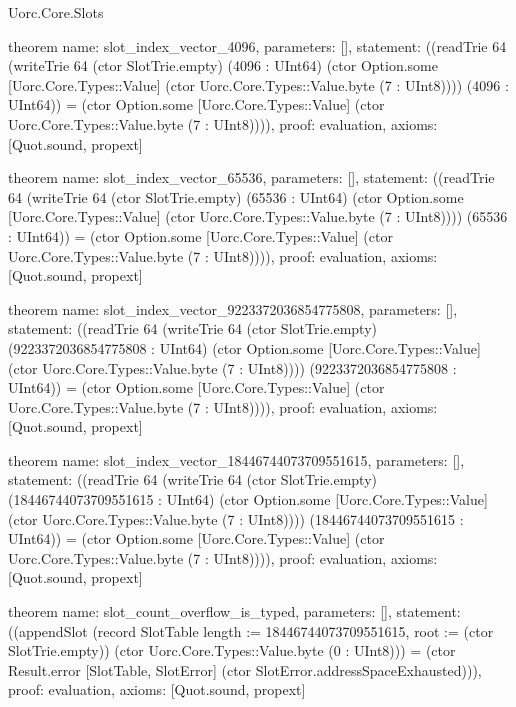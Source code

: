 \begin{lexlean}{Uorc.Core.Slots}
\begin{semanticmodule}
theorem{
  name: slot_index_vector_4096,
  parameters: [],
  statement: ((readTrie 64 (writeTrie 64 (ctor SlotTrie.empty) (4096 : UInt64) (ctor Option.some [Uorc.Core.Types::Value] (ctor Uorc.Core.Types::Value.byte (7 : UInt8)))) (4096 : UInt64)) = (ctor Option.some [Uorc.Core.Types::Value] (ctor Uorc.Core.Types::Value.byte (7 : UInt8)))),
  proof: evaluation{},
  axioms: [Quot.sound, propext]
}

theorem{
  name: slot_index_vector_65536,
  parameters: [],
  statement: ((readTrie 64 (writeTrie 64 (ctor SlotTrie.empty) (65536 : UInt64) (ctor Option.some [Uorc.Core.Types::Value] (ctor Uorc.Core.Types::Value.byte (7 : UInt8)))) (65536 : UInt64)) = (ctor Option.some [Uorc.Core.Types::Value] (ctor Uorc.Core.Types::Value.byte (7 : UInt8)))),
  proof: evaluation{},
  axioms: [Quot.sound, propext]
}

theorem{
  name: slot_index_vector_9223372036854775808,
  parameters: [],
  statement: ((readTrie 64 (writeTrie 64 (ctor SlotTrie.empty) (9223372036854775808 : UInt64) (ctor Option.some [Uorc.Core.Types::Value] (ctor Uorc.Core.Types::Value.byte (7 : UInt8)))) (9223372036854775808 : UInt64)) = (ctor Option.some [Uorc.Core.Types::Value] (ctor Uorc.Core.Types::Value.byte (7 : UInt8)))),
  proof: evaluation{},
  axioms: [Quot.sound, propext]
}

theorem{
  name: slot_index_vector_18446744073709551615,
  parameters: [],
  statement: ((readTrie 64 (writeTrie 64 (ctor SlotTrie.empty) (18446744073709551615 : UInt64) (ctor Option.some [Uorc.Core.Types::Value] (ctor Uorc.Core.Types::Value.byte (7 : UInt8)))) (18446744073709551615 : UInt64)) = (ctor Option.some [Uorc.Core.Types::Value] (ctor Uorc.Core.Types::Value.byte (7 : UInt8)))),
  proof: evaluation{},
  axioms: [Quot.sound, propext]
}

theorem{
  name: slot_count_overflow_is_typed,
  parameters: [],
  statement: ((appendSlot (record SlotTable {length := 18446744073709551615, root := (ctor SlotTrie.empty)}) (ctor Uorc.Core.Types::Value.byte (0 : UInt8))) = (ctor Result.error [SlotTable, SlotError] (ctor SlotError.addressSpaceExhausted))),
  proof: evaluation{},
  axioms: [Quot.sound, propext]
}
\end{semanticmodule}
\end{lexlean}
